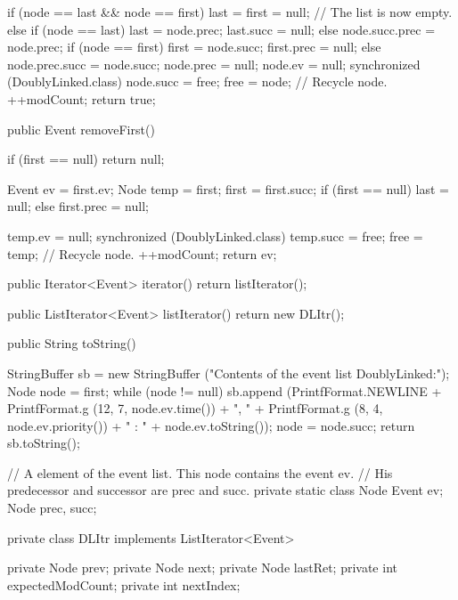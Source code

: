 \begin{hide}
\begin{code}
\begin{hide}
{      if (node == last && node == first)
         last = first = null; // The list is now empty.
      else {
         if (node == last) {
            last = node.prec;
            last.succ = null;
         }
         else
            node.succ.prec = node.prec;
         if (node == first) {
            first = node.succ;
            first.prec = null;
         }
         else {
            node.prec.succ = node.succ;
            node.prec = null;
         }
      }
      node.ev = null;
      synchronized (DoublyLinked.class) {
         node.succ = free;  free = node;  // Recycle node.
      }
      ++modCount;
      return true;
   }\end{hide}

   public Event removeFirst()\begin{hide} {
      if (first == null)
         return null;

      Event ev = first.ev;
      Node temp = first;
      first = first.succ;
      if (first == null)
         last = null;
      else
         first.prec = null;

      temp.ev = null;
      synchronized (DoublyLinked.class) {
         temp.succ = free;  free = temp;   // Recycle node.
      }
      ++modCount;
      return ev;
   }

   public Iterator<Event> iterator() {
      return listIterator();
   }

   public ListIterator<Event> listIterator() {
      return new DLItr();
   }\end{hide}

   public String toString()\begin{hide} {
      StringBuffer sb = new StringBuffer ("Contents of the event list DoublyLinked:");
      Node node = first;
      while (node != null) {
         sb.append (PrintfFormat.NEWLINE +
                    PrintfFormat.g (12, 7, node.ev.time()) + ", " +
                    PrintfFormat.g (8, 4, node.ev.priority()) + " : " +
                    node.ev.toString());
         node = node.succ;
      }
      return sb.toString();
   }

   // A element of the event list. This node contains the event ev.
   // His predecessor and successor are prec and succ.
   private static class Node {
      Event ev;
      Node prec, succ;
   }

   private class DLItr implements ListIterator<Event> {
      private Node prev;
      private Node next;
      private Node lastRet;
      private int expectedModCount;
      private int nextIndex;

}
\end{hide}
\end{code}
\end{hide}
